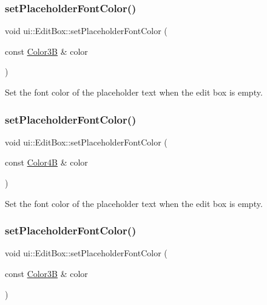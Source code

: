 \subsubsection{\texorpdfstring{set\+Placeholder\+Font\+Color()}{setPlaceholderFontColor()}\hspace{0.1cm}{\footnotesize\ttfamily [1/4]}}
{\footnotesize\ttfamily void ui\+::\+Edit\+Box\+::set\+Placeholder\+Font\+Color (\begin{DoxyParamCaption}\item[{const \hyperlink{structColor3B}{Color3B} \&}]{color }\end{DoxyParamCaption})}

Set the font color of the placeholder text when the edit box is empty. \mbox{\label{classui_1_1EditBox_a29ddb4a951ce3cd8c2946ed13cf4c2ee}} 
\subsubsection{\texorpdfstring{set\+Placeholder\+Font\+Color()}{setPlaceholderFontColor()}\hspace{0.1cm}{\footnotesize\ttfamily [2/4]}}
{\footnotesize\ttfamily void ui\+::\+Edit\+Box\+::set\+Placeholder\+Font\+Color (\begin{DoxyParamCaption}\item[{const \hyperlink{structColor4B}{Color4B} \&}]{color }\end{DoxyParamCaption})}

Set the font color of the placeholder text when the edit box is empty. \mbox{\label{classui_1_1EditBox_a84cdeb802d3ab4e78c036d49a2ffefed}} 
\subsubsection{\texorpdfstring{set\+Placeholder\+Font\+Color()}{setPlaceholderFontColor()}\hspace{0.1cm}{\footnotesize\ttfamily [3/4]}}
{\footnotesize\ttfamily void ui\+::\+Edit\+Box\+::set\+Placeholder\+Font\+Color (\begin{DoxyParamCaption}\item[{const \hyperlink{structColor3B}{Color3B} \&}]{color }\end{DoxyParamCaption})}

